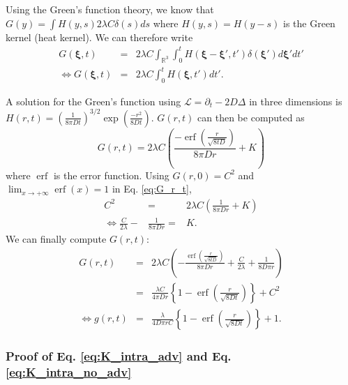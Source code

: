 \documentclass[12pt,english]{article}
\DeclareMathOperator\erf{erf}
\begin{document}
Using the Green's function theory, we know that $G(y)=\int H(y,s)2\lambda C\delta(s)ds$
where $H(y,s)=H(y-s)$ is the Green kernel (heat kernel). We can therefore
write 
\begin{equation}
\begin{array}{ccc}
G(\boldsymbol{\xi},t) & = & 2\lambda C\int_{\mathbb{R}^{3}}\int_{0}^{t}H(\boldsymbol{\xi}-\boldsymbol{\xi}',t')\delta(\boldsymbol{\xi}')d\boldsymbol{\xi}'dt'\\
\Leftrightarrow G(\boldsymbol{\xi},t) & = & 2\lambda C\int_{0}^{t}H(\boldsymbol{\boldsymbol{\xi}},t')dt'.
\end{array}
\end{equation}

A solution for the Green's function using $\mathcal{L}=\partial_{t}-2D\Delta$
in three dimensions is $H(r,t)=\left(\frac{1}{8\pi Dt}\right)^{3/2}\exp(\frac{-r^{2}}{8Dt})$.
$G(r,t)$ can then be computed as 
\begin{equation}
G(r,t)=2\lambda C\left(\frac{-\erf\left(\frac{r}{\sqrt{8tD}}\right)}{8\pi Dr}+K\right)\label{eq:G_r_t}
\end{equation}
where $\erf$ is the error function. Using $G(r,0)=C^{2}$ and $\lim_{x\rightarrow+\infty}\erf(x)=1$
in Eq. \ref{eq:G_r_t}, 
\begin{equation}
\begin{array}{ccc}
C^{2} & = & 2\lambda C\left(\frac{1}{8\pi Dr}+K\right)\\
\Leftrightarrow\frac{C}{2\lambda}- & \frac{1}{8\pi Dr}= & K.
\end{array}
\end{equation}
We can finally compute $G(r,t)$: 
\begin{equation}
\begin{array}{ccc}
G(r,t) & = & 2\lambda C\left(-\frac{\erf\left(\frac{r}{\sqrt{8tD}}\right)}{8\pi Dr}+\frac{C}{2\lambda}+\frac{1}{8D\pi r}\right)\\
 & = & \frac{\lambda C}{4\pi Dr}\left\{ 1-\erf\left(\frac{r}{\sqrt{8Dt}}\right)\right\} +C^{2}\\
\Leftrightarrow g(r,t) & = & \frac{\lambda}{4D\pi rC}\left\{ 1-\erf\left(\frac{r}{\sqrt{8Dt}}\right)\right\} +1.
\end{array}\label{eq:pcf_noadv_bbm}
\end{equation}


\subsubsection*{Proof of Eq. \ref{eq:K_intra_adv} and Eq. \ref{eq:K_intra_no_adv}}
\end{document}
